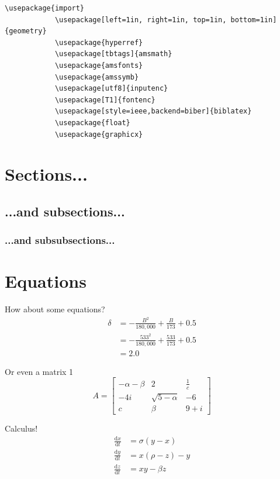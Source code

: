 \documentclass[hidelinks, 12pt]{article}%
\begin{document}
        \begin{lstlisting}[language={[LaTeX]TeX}]
            \usepackage{import}
            \usepackage[left=1in, right=1in, top=1in, bottom=1in]{geometry}
            \usepackage{hyperref}
            \usepackage[tbtags]{amsmath}
            \usepackage{amsfonts}
            \usepackage{amssymb}
            \usepackage[utf8]{inputenc}
            \usepackage[T1]{fontenc}
            \usepackage[style=ieee,backend=biber]{biblatex}
            \usepackage{float}
            \usepackage{graphicx}
        \end{lstlisting}

    \section{Sections...}
        \subsection{...and subsections...}
            \subsubsection{...and subsubsections...}

    \section{Equations}
        How about some equations?
        \begin{align}
            \delta &= - \frac{B^{2}}{180,000} + \frac{B}{173} + 0.5\nonumber\\
            &= - \frac{533^{2}}{180,000} + \frac{533}{173} + 0.5 \nonumber\\
            &= 2.0 \nonumber
        \end{align}
        
        Or even a matrix 1
        \begin{equation*}
            A = 
            \begin{bmatrix}
                -\alpha-\beta & 2 & \frac{1}{c}\\
                -4i & \sqrt{5-\alpha} & -6\\
                c & \beta & 9 + i
            \end{bmatrix}
        \end{equation*}

        Calculus!
        \begin{align}
            \frac{\text{d}x}{\text{d}t} &= \sigma (y-x)\\
            \frac{\text{d}y}{\text{d}t} &= x(\rho -z)-y\\
            \frac{\text{d}z}{\text{d}t} &= xy-\beta z
        \end{align}
\end{document}
